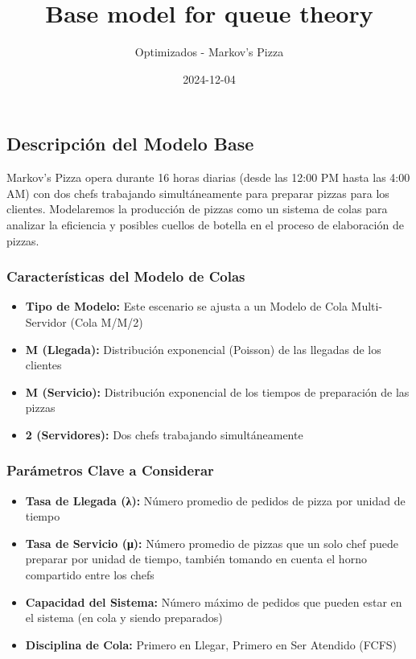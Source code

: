 \documentclass[
]{article}
\title{Base model for queue theory}
\author{Optimizados - Markov's Pizza}
\date{2024-12-04}
\providecommand{\tightlist}{%
  \setlength{\itemsep}{0pt}\setlength{\parskip}{0pt}}
\begin{document}
\maketitle

\subsection{Descripción del Modelo
Base}\label{descripciuxf3n-del-modelo-base}

Markov's Pizza opera durante 16 horas diarias (desde las 12:00 PM hasta
las 4:00 AM) con dos chefs trabajando simultáneamente para preparar
pizzas para los clientes. Modelaremos la producción de pizzas como un
sistema de colas para analizar la eficiencia y posibles cuellos de
botella en el proceso de elaboración de pizzas.

\subsubsection{Características del Modelo de
Colas}\label{caracteruxedsticas-del-modelo-de-colas}

\begin{itemize}
\tightlist
\item
  \textbf{Tipo de Modelo:} Este escenario se ajusta a un Modelo de Cola
  Multi-Servidor (Cola M/M/2)
\item
  \textbf{M (Llegada):} Distribución exponencial (Poisson) de las
  llegadas de los clientes
\item
  \textbf{M (Servicio):} Distribución exponencial de los tiempos de
  preparación de las pizzas
\item
  \textbf{2 (Servidores):} Dos chefs trabajando simultáneamente
\end{itemize}

\subsubsection{Parámetros Clave a
Considerar}\label{paruxe1metros-clave-a-considerar}

\begin{itemize}
\tightlist
\item
  \textbf{Tasa de Llegada (λ):} Número promedio de pedidos de pizza por
  unidad de tiempo
\item
  \textbf{Tasa de Servicio (μ):} Número promedio de pizzas que un solo
  chef puede preparar por unidad de tiempo, también tomando en cuenta el
  horno compartido entre los chefs
\item
  \textbf{Capacidad del Sistema:} Número máximo de pedidos que pueden
  estar en el sistema (en cola y siendo preparados)
\item
  \textbf{Disciplina de Cola:} Primero en Llegar, Primero en Ser
  Atendido (FCFS)
\end{itemize}
\end{document}
